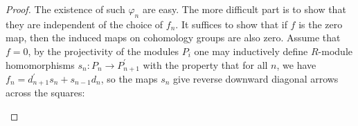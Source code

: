 \begin{proof}
The existence of such $\varphi_n$ are easy. The more difficult part is to show that they are independent of the choice of $f_n$. It suffices to show that if $f$ is the zero map, then the induced maps on cohomology groups are also zero. Assume that $f=0$, by the projectivity of the modules $P_i$ one may inductively define $R$-module homomorphisms $s_n:P_n\to P_{n+1}^\prime$ with the property that for all $n$, we have $f_n=d_{n+1}^\prime s_n+s_{n-1}d_n$, so the maps $s_n$ give reverse downward diagonal arrows across the squares: 
\begin{center}



\begin{tikzpicture}[x=0.75pt,y=0.75pt,yscale=-1,xscale=1]


\end{tikzpicture}
\end{center}
\end{proof}
